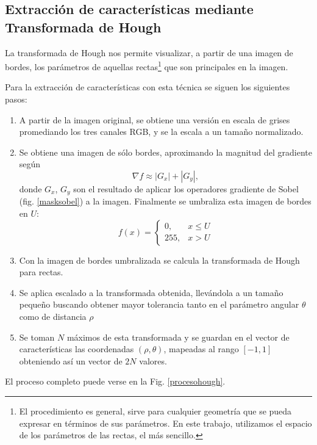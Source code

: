 \documentclass[conference,spanish,a4paper,10pt,oneside,final]{tfmpd}
\begin{document}
\subsection*{Extracción de características mediante Transformada de Hough}
La transformada de Hough nos permite visualizar, a partir de una imagen de
bordes, los parámetros de aquellas rectas\footnote{El procedimiento es general,
sirve para cualquier geometría que se pueda expresar en términos de sus
parámetros. En este trabajo, utilizamos el espacio de los parámetros de las
rectas, el más sencillo.}
que son principales en la imagen.

Para la extracción de características con esta técnica se siguen los siguientes
pasos:
\begin{enumerate}
\item A partir de la imagen original, se obtiene una versión en escala de grises
      promediando los tres canales RGB, y se la escala a un tamaño normalizado.
\item Se obtiene una imagen de sólo bordes, aproximando la magnitud del
      gradiente según
      \begin{equation}
      \label{sob}
      \nabla f \approx |G_x| + |G_y|,
      \end{equation}
      donde $G_x$, $G_y$ son el resultado de aplicar los operadores gradiente
      de Sobel (fig. \ref{masksobel}) a la imagen. 
      Finalmente se umbraliza esta imagen de bordes en $U$:
      \begin{equation}
      \label{umbral}
      f(x)=
      \begin{cases}
      0, & x\leq U\\
      255, & x > U
      \end{cases}
      \end{equation}
\item Con la imagen de bordes umbralizada se calcula la transformada de
      Hough para rectas.
\item Se aplica escalado a la transformada obtenida, llevándola a un tamaño
      pequeño buscando obtener mayor tolerancia tanto en el parámetro angular
      $\theta$ como de distancia $\rho$
\item Se toman $N$ máximos de esta transformada y se guardan en el vector de
      características las coordenadas $(\rho,\theta)$, mapeadas al rango
      $[-1,1]$ obteniendo así un vector de $2N$ valores.
\end{enumerate}
El proceso completo puede verse en la Fig. \ref{procesohough}.
\end{document}

